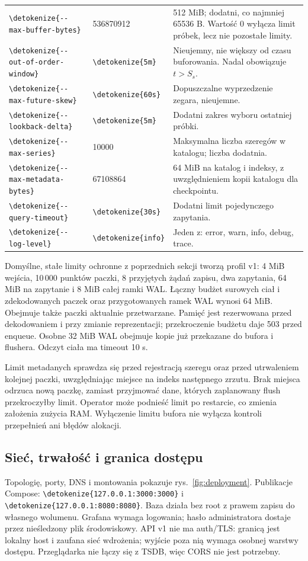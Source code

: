 \documentclass[11pt,a4paper]{article}
\newcommand{\code}[1]{\expandafter\nolinkurl\expandafter{\detokenize{#1}}}
\begin{document}
\begin{longtable}{P{54mm}P{25mm}P{77mm}}
\code{--max-buffer-bytes} & 536870912 & 512 MiB; dodatni,
co najmniej 65536 B. Wartość 0 wyłącza limit próbek, lecz nie pozostałe limity.\\
\code{--out-of-order-window} & \code{5m} &
Nieujemny, nie większy od czasu buforowania. Nadal obowiązuje $t>S_s$.\\
\code{--max-future-skew} & \code{60s} & Dopuszczalne wyprzedzenie zegara,
nieujemne.\\
\code{--lookback-delta} & \code{5m} & Dodatni zakres wyboru ostatniej próbki.\\
\code{--max-series} & 10000 & Maksymalna liczba szeregów w katalogu;
liczba dodatnia.\\
\code{--max-metadata-bytes} & 67108864 &
64 MiB na katalog i indeksy, z uwzględnieniem kopii katalogu dla checkpointu.\\
\code{--query-timeout} & \code{30s} & Dodatni limit pojedynczego zapytania.\\
\code{--log-level} & \code{info} & Jeden z: error, warn, info, debug, trace.\\
\end{longtable}

Domyślne, stałe limity ochronne z poprzednich sekcji tworzą profil v1:
4 MiB wejścia, 10\,000 punktów paczki, 8 przyjętych żądań zapisu,
dwa zapytania,
64 MiB na zapytanie i 8 MiB całej ramki WAL. Łączny budżet surowych ciał
i zdekodowanych paczek oraz przygotowanych ramek WAL wynosi 64 MiB.
Obejmuje także paczki aktualnie przetwarzane. Pamięć jest rezerwowana
przed dekodowaniem i przy zmianie reprezentacji; przekroczenie budżetu
daje 503 przed enqueue. Osobne 32 MiB WAL obejmuje kopie już przekazane
do bufora i flushera. Odczyt ciała ma timeout 10 s.

Limit metadanych sprawdza się przed rejestracją szeregu oraz przed
utrwaleniem kolejnej paczki, uwzględniając miejsce na indeks następnego
zrzutu. Brak miejsca odrzuca nową paczkę, zamiast przyjmować dane,
których zaplanowany flush przekroczyłby limit. Operator może podnieść
limit po restarcie, co zmienia założenia zużycia RAM.
Wyłączenie limitu bufora nie wyłącza kontroli przepełnień ani błędów alokacji.

\subsection{Sieć, trwałość i granica dostępu}
\label{sec:network}
Topologię, porty, DNS i montowania pokazuje rys.~\ref{fig:deployment}.
Publikacje Compose: \code{127.0.0.1:3000:3000}
i \code{127.0.0.1:8080:8080}.
Baza działa bez root z prawem zapisu do własnego wolumenu.
Grafana wymaga logowania; hasło administratora dostaje przez nieśledzony
plik środowiskowy. API v1 nie ma auth/TLS: granicą jest lokalny host
i zaufana sieć wdrożenia; wyjście poza nią wymaga osobnej warstwy dostępu.
Przeglądarka nie łączy się z TSDB, więc CORS nie jest potrzebny.
\end{document}
